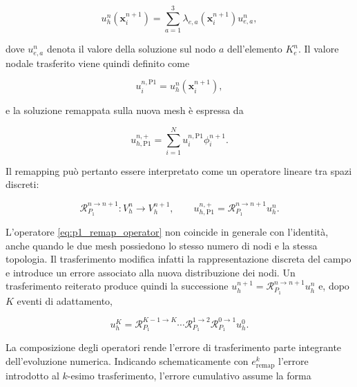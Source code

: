 \begin{equation}
u_h^n(\mathbf{x}_i^{n+1})
=
\sum_{a=1}^{3}
\lambda_{e,a}(\mathbf{x}_i^{n+1})
u_{e,a}^n,
\label{eq:pointwise_barycentric_interpolation}
\end{equation}

dove $u_{e,a}^n$ denota il valore della soluzione sul nodo $a$ dell'elemento $K_e^n$. Il valore nodale trasferito viene quindi definito come

\begin{equation}
u_i^{n,\mathrm{P1}}
=
u_h^n(\mathbf{x}_i^{n+1}),
\label{eq:p1_remap_node}
\end{equation}

e la soluzione remappata sulla nuova mesh è espressa da

\begin{equation}
u_{h,\mathrm{P1}}^{n,+}
=
\sum_{i=1}^{N}
u_i^{n,\mathrm{P1}}
\phi_i^{n+1}.
\label{eq:p1_remapped_field}
\end{equation}

Il remapping può pertanto essere interpretato come un operatore lineare tra spazi discreti:

\begin{equation}
\mathcal{R}_{P_1}^{n\rightarrow n+1}:
V_h^n
\longrightarrow
V_h^{n+1},
\qquad
u_{h,\mathrm{P1}}^{n,+}
=
\mathcal{R}_{P_1}^{n\rightarrow n+1}
u_h^n.
\label{eq:p1_remap_operator}
\end{equation}

L'operatore \eqref{eq:p1_remap_operator} non coincide in generale con l'identità, anche quando le due mesh possiedono lo stesso numero di nodi e la stessa topologia. Il trasferimento modifica infatti la rappresentazione discreta del campo e introduce un errore associato alla nuova distribuzione dei nodi. Un trasferimento reiterato produce quindi la successione $u_h^{n+1} = \mathcal{R}_{P_1}^{n\rightarrow n+1} u_h^n$ e, dopo $K$ eventi di adattamento,

\begin{equation}
u_h^{K}
=
\mathcal{R}_{P_1}^{K-1\rightarrow K}
\cdots
\mathcal{R}_{P_1}^{1\rightarrow2}
\mathcal{R}_{P_1}^{0\rightarrow1}
u_h^0.
\label{eq:cumulative_remap}
\end{equation}

La composizione degli operatori rende l'errore di trasferimento parte integrante dell'evoluzione numerica. Indicando schematicamente con $e_{\mathrm{remap}}^k$ l'errore introdotto al $k$-esimo trasferimento, l'errore cumulativo assume la forma

